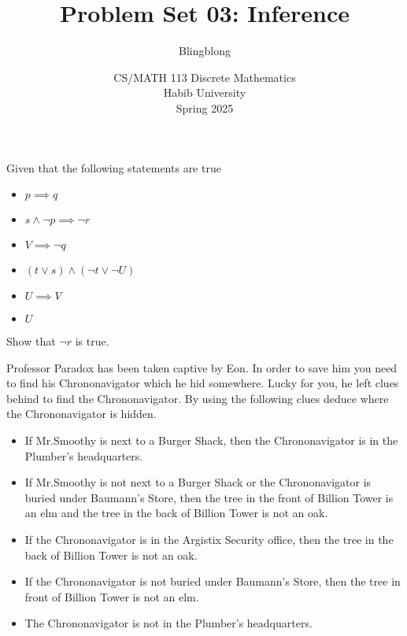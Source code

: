 \documentclass[a4paper]{exam}
\title{Problem Set 03: Inference}
\author{Blingblong} %
\date{CS/MATH 113 Discrete Mathematics\\Habib University\\Spring 2025}
\begin{document}
\maketitle

\begin{questions}
    Given that the following statements are true
    \begin{itemize}
        \item $p \implies q$
        \item $s \land \neg p \implies \neg r$
        \item $V \implies \neg q$
        \item $(t \lor s) \land (\neg t \lor \neg U)$
        \item $U \implies V$
        \item $U$
    \end{itemize}
    Show that $\neg r$ is true.
    \begin{solution}
    \end{solution}


    Professor Paradox has been taken captive by Eon. In order to save him you need to find his Chrononavigator which he hid somewhere.
    Lucky for you, he left clues behind to find the Chrononavigator. By using the following clues deduce where the Chrononavigator is hidden.
    \begin{itemize}
        \item If Mr.Smoothy is next to a Burger Shack, then the Chrononavigator is in the Plumber's headquarters.
        \item If Mr.Smoothy is not next to a Burger Shack or the Chrononavigator is buried under Baumann's Store, then the tree in the front of Billion Tower is an elm and the tree in the back of Billion Tower is not an oak.
        \item If the Chrononavigator is in the Argistix Security office, then the tree in the back of Billion Tower is not an oak.
        \item If the Chrononavigator is not buried under Baumann's Store, then the tree in front of Billion Tower is not an elm.
        \item The Chrononavigator is not in the Plumber's headquarters.
    \end{itemize}

    \begin{solution}


\end{solution}
\end{questions}
\end{document}
